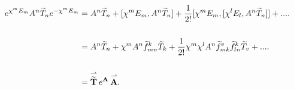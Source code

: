 \begin{equation}
\begin{aligned}
e^{\chi ^{m}E_{m}}A^{n}\widetilde{T}_{n}e^{-\chi
^{m}E_{m}}&=A^{n}\widetilde{T}_{n}+[\chi ^{m}E_{m},A^{n}\widetilde{T}_{n}]+%
\frac{1}{2!}[\chi ^{m}E_{m},[\chi ^{l}E_{l},A^{n}\widetilde{T}_{n}]]+....\\
\\
&=A^{n}%
\widetilde{T}_{n}+\chi ^{m}A^{n}\widetilde{f}_{mn}^{k}\widetilde{T}_{k}+%
\frac{1}{2!}\chi ^{m}\chi ^{l}A^{n}\widetilde{f}_{mk}^{v}\widetilde{f}%
_{ln}^{k}\widetilde{T}_{v}+....\\
\\
&=\overset{%
\rightharpoonup }{\widetilde{\mathbf{T}}}\:e^{\mathbf{\Lambda }}%
\:\overset{\rightharpoonup }{\mathbf{A}}.
\end{aligned}
\end{equation}

